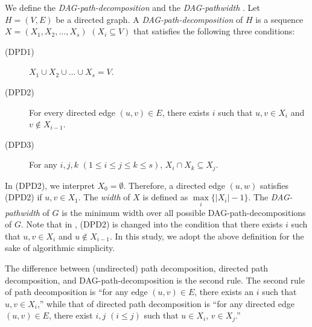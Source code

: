\documentclass[runningheads]{llncs}
\theoremstyle{plain}
\theoremstyle{definition}
\begin{document}

We define the \emph{DAG-path-decomposition} and the \emph{DAG-pathwidth} \cite{art12}. Let $H = (V, E)$ be a directed graph. A \emph{DAG-path-decomposition} of $H$ is a sequence $X = (X_1, X_2, \dots, X_s)$ $(X_i \subseteq V)$ that satisfies the following three conditions:
\begin{description}
    \item[(DPD1)] $X_1 \cup X_2 \cup \dots \cup X_s = V$.
    \item[(DPD2)] For every directed edge $(u, v) \in E$, there exists $i$ such that $u, v \in X_i$ and $v \notin X_{i-1}$. \label{original_rule}
    \item[(DPD3)] For any $i, j, k$ $(1 \leq i \leq j \leq k \leq s)$, $X_i \cap X_k \subseteq X_j$. %
\end{description}
In (DPD2), we interpret $X_0 = \emptyset$. Therefore, a directed edge $(u, w)$ satisfies (DPD2) if $u, v \in X_1$. The \emph{width} of $X$ is defined as $\underset{i}{\max} \{ |X_i| - 1 \}$. The \emph{DAG-pathwidth} of $G$ is the minimum width over all possible DAG-path-decompositions of $G$. Note that in \cite{art12}, (DPD2) is changed into the condition that there exists $i$ such that $u, v \in X_i$ and $u \notin X_{i-1}$. In this study, we adopt the above definition for the sake of algorithmic simplicity.


The difference between (undirected) path decomposition,
directed path decomposition, and DAG-path-decomposition is the second rule. The second rule of path decomposition is ``for any edge $(u, v) \in E$, there exists an $i$ such that $u, v \in X_i$,''  while that of directed path decomposition is ``for any directed edge $(u, v) \in E$, there exist $i, j$ $(i \leq j)$ such that $u \in X_i$, $v \in X_j$.'' %
\end{document}
